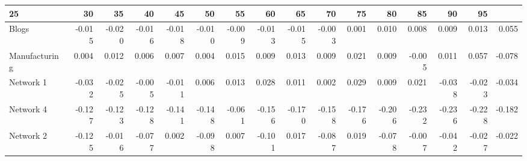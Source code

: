 \begin{tabular}{@{}lrrrrrrrrrrrrrrr@{}}
\toprule

25 & 30 & 35 & 40 & 45 & 50 & 55 & 60 & 65 & 70 & 75 & 80 & 85 & 90 & 95 \\\midrule

Blogs & -0.015 & -0.020 & -0.016 & -0.018 & -0.010 & -0.009 & -0.013 & -0.015 & -0.003 & 0.001 & 0.010 & 0.008 & 0.009 & 0.013 & 0.055 \\
Manufacturing & 0.004 & 0.012 & 0.006 & 0.007 & 0.004 & 0.015 & 0.009 & 0.013 & 0.009 & 0.021 & 0.009 & -0.005 & 0.011 & 0.057 & -0.078 \\
Network
1 & -0.032 & -0.025 & -0.005 & -0.011 & 0.006 & 0.013 & 0.028 & 0.011 & 0.002 & 0.029 & 0.009 & 0.021 & -0.038 & -0.023 & -0.034 \\
Network
4 & -0.127 & -0.123 & -0.128 & -0.141 & -0.148 & -0.061 & -0.156 & -0.170 & -0.158 & -0.176 & -0.206 & -0.232 & -0.236 & -0.228 & -0.182 \\
Network
2 & -0.125 & -0.016 & -0.077 & 0.002 & -0.098 & 0.007 & -0.101 & 0.017 & -0.087 & 0.019 & -0.078 & -0.007 & -0.042 & -0.027 & -0.022 \\

\bottomrule
\end{tabular}
